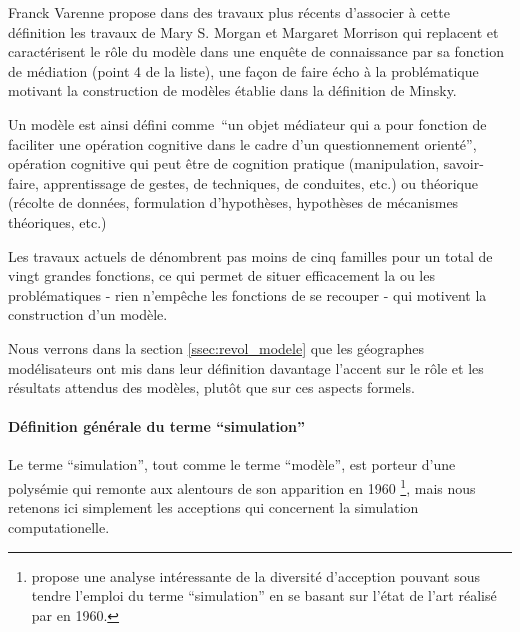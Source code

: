 Franck Varenne propose dans des travaux plus récents \autocite{Varenne2013} d'associer à cette définition les travaux de Mary S. Morgan et Margaret Morrison qui replacent et caractérisent le rôle du modèle dans une enquête de connaissance par sa fonction de médiation (point 4 de la liste), une façon de faire écho à la problématique motivant la construction de modèles établie dans la définition de Minsky.

Un modèle est ainsi défini comme \enquote{un objet médiateur qui a pour fonction de faciliter une opération cognitive dans le cadre d'un questionnement orienté}, opération cognitive qui peut être de cognition pratique (manipulation, savoir-faire, apprentissage de gestes, de techniques, de conduites, etc.) ou théorique (récolte de données, formulation d'hypothèses, hypothèses de mécanismes théoriques, etc.) \autocite{Varenne2013}

Les travaux actuels de \textcite{Varenne2008, Varenne2013} dénombrent pas moins de cinq familles pour un total de vingt grandes fonctions, ce qui permet de situer efficacement la ou les problématiques - rien n’empêche les fonctions de se recouper - qui motivent la construction d'un modèle. 

Nous verrons dans la section \ref{ssec:revol_modele} que les géographes modélisateurs ont mis dans leur définition davantage l'accent sur le rôle et les résultats attendus des modèles, plutôt que sur ces aspects formels.

\paragraph{Définition générale du terme \enquote{simulation}}

Le terme \enquote{simulation}, tout comme le terme \enquote{modèle}, est porteur d'une polysémie qui remonte aux alentours de son apparition en 1960 \footnote{ \textcite[343-350]{Morgan2004} propose une analyse intéressante de la diversité d’acception pouvant sous tendre l'emploi du terme \enquote{simulation} en se basant sur l'état de l'art réalisé par \textcite{Shubik1960a} en 1960.}, mais nous retenons ici simplement les acceptions qui concernent la simulation computationelle. 

